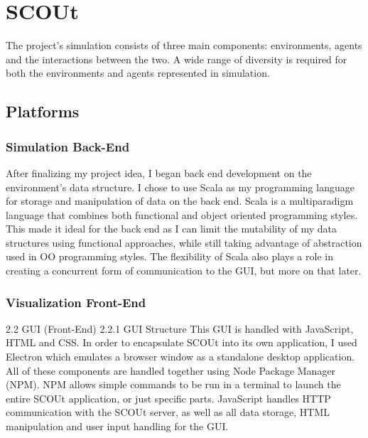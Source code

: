

\chapter{SCOUt}
The project’s simulation consists of three main components: environments, agents and the interactions between the two.
A wide range of diversity is required for both the environments and agents represented in simulation.


\section{Platforms}


\subsection{Simulation Back-End}
After finalizing my project idea, I began back end development on the environment’s data structure.
I chose to use Scala as my programming language for storage and manipulation of data on the back end.
Scala is a multiparadigm language that combines both functional and object oriented programming styles.
This made it ideal for the back end as I can limit the mutability of my data structures using functional approaches, while still taking advantage of abstraction used in OO programming styles.
The flexibility of Scala also plays a role in creating a concurrent form of communication to the GUI, but more on that later.


\subsection{Visualization Front-End}
2.2 GUI (Front-End)
2.2.1 GUI Structure
This GUI is handled with JavaScript, HTML and CSS.
In order to encapsulate SCOUt into its own application, I used Electron which emulates a browser window as a standalone desktop application.
All of these components are handled together using Node Package Manager (NPM).
NPM allows simple commands to be run in a terminal to launch the entire SCOUt application, or just specific parts.
JavaScript handles HTTP communication with the SCOUt server, as well as all data storage, HTML manipulation and user input handling for the GUI.

